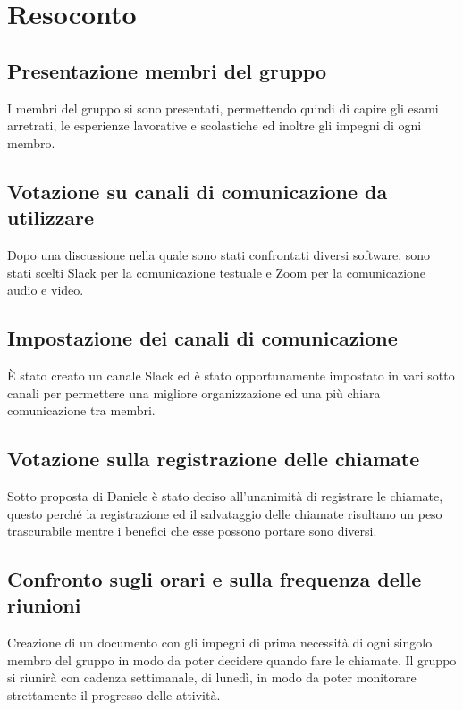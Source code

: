 \section{Resoconto}

\subsection{Presentazione membri del gruppo}

I membri del gruppo si sono presentati, permettendo quindi di capire gli esami arretrati, le esperienze lavorative e scolastiche ed inoltre gli impegni di ogni membro.

\subsection{Votazione su canali di comunicazione da utilizzare}

Dopo una discussione nella quale sono stati confrontati diversi software, sono stati scelti Slack per la comunicazione testuale e Zoom per la comunicazione audio e video.

\subsection{Impostazione dei canali di comunicazione}

È stato creato un canale Slack ed è stato opportunamente impostato in vari sotto canali per permettere una migliore organizzazione ed una più chiara comunicazione tra membri.

\subsection{Votazione sulla registrazione delle chiamate}

Sotto proposta di Daniele è stato deciso all'unanimità di registrare le chiamate, questo perché la registrazione ed il salvataggio delle chiamate risultano un peso trascurabile mentre i benefici che esse possono portare sono diversi.

\subsection{Confronto sugli orari e sulla frequenza delle riunioni}

Creazione di un documento con gli impegni di prima necessità di ogni singolo membro del gruppo in modo da poter decidere quando fare le chiamate. Il gruppo si riunirà con cadenza settimanale, di lunedì, in modo da poter monitorare strettamente il progresso delle attività.


